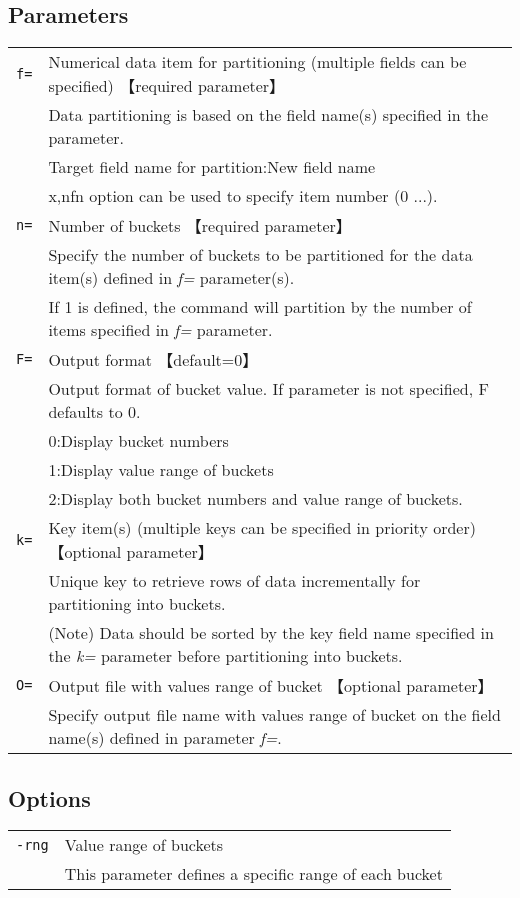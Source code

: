 \documentclass[a4paper]{jarticle}
\begin{document}
\subsection*{Parameters}
\begin{table}[htbp]
{\small
\begin{tabular}{ll}
\verb|f=|    & Numerical data item for partitioning (multiple fields can be specified) 【required parameter】\\
& Data partitioning is based on the field name(s) specified in the parameter. \\
& Target field name for partition:New field name \\
& x,nfn option can be used to specify item number (0 ...).\\
\verb|n=|    & Number of buckets 【required parameter】\\
& Specify the number of buckets to be partitioned for the data item(s) defined in \emph{f=} parameter(s). \\
& If 1 is defined, the command will partition by the number of items specified in \emph{f=} parameter.
\\
\verb|F=|    & Output format 【default=0】\\
& Output format of bucket value. If parameter is not specified, F defaults to 0.\\
& 0:Display bucket numbers\\
& 1:Display value range of buckets\\
& 2:Display both bucket numbers and value range of buckets. \\
\verb|k=|    & Key item(s) (multiple keys can be specified in priority order) 【optional parameter】\\
& Unique key to retrieve rows of data incrementally for partitioning into buckets.\\
& (Note) Data should be sorted by the key field name specified in the \emph{k=} parameter before partitioning into buckets.\\
\verb|O=|    & Output file with values range of bucket 【optional parameter】\\
& Specify output file name with values range of bucket on the field name(s) defined in parameter \emph{f=}. \\

\end{tabular} 
}
\end{table} 

\subsection*{Options}
\begin{table}[htbp]
{\small
\begin{tabular}{ll}
\verb|-rng|  & Value range of buckets \\
& This parameter defines a specific range of each bucket\\
\end{tabular} 
}
\end{table} 
\end{document}
